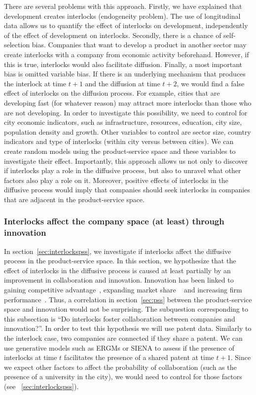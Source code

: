 There are several problems with this approach.
Firstly, we have explained that development creates interlocks (endogeneity problem).
The use of longitudinal data allows us to quantify the effect of interlocks on development,
independently of the effect of development on interlocks.
Secondly, there is a chance of self-selection bias.
Companies that want to develop a product in another sector may create interlocks with a company from economic activity beforehand.
However, if this is true, interlocks would also facilitate diffusion.
Finally, a most important bias is omitted variable bias.
If there is an underlying mechanism that produces the interlock at time $t + 1$ and the diffusion at time $t + 2$, 
we would find a false effect of interlocks on the diffusion process.
For example, cities that are developing fast (for whatever reason) may attract more interlocks than those who are not developing.
In order to investigate this possibility, we need to control for city economic indicators, such as infrastructure, resources, education, city size, population density and growth.
Other variables to control are sector size, country indicators and type of interlocks (within city versus between cities).
We can create random models using the product-service space and these variables to investigate their effect.
Importantly, this approach allows us not only to discover if interlocks play a role in the diffusive process, 
but also to unravel what other factors also play a role on it.
Moreover, positive effects of interlocks in the diffusive process would imply that companies should seek interlocks in companies that are adjacent in the product-service space.


\subsubsection{Interlocks affect the company space (at least) through innovation}
In section~\ref{sec:interlockspss}, we investigate if interlocks affect the diffusive process in the product-service space.
In this section, we hypothesize that the effect of interlocks in the diffusive process is caused at least partially by an improvement in collaboration and innovation.
Innovation has been linked to gaining competitive advantage~\citep{Hitt1996}, expanding market share ~\citep{Franko1989} and increasing firm performance~\citep{Morbey1988}.
Thus, a correlation in section~\ref{sec:pss} between the product-service space and innovation would not be surprising. 
The subquestion corresponding to this subsection is ``Do interlocks foster collaboration between companies and innovation?''.
In order to test this hypothesis we will use patent data.
Similarly to the interlock case, two companies are connected if they share a patent.
We can use generative models such as ERGMs or SIENA to assess if the presence of interlocks at time $t$ facilitates the presence of a shared patent at time $t+1$. 
Since we expect other factors to affect the probability of collaboration (such as the presence of a university in the city),
we would need to control for those factors (see ~\ref{sec:interlockspss}).


